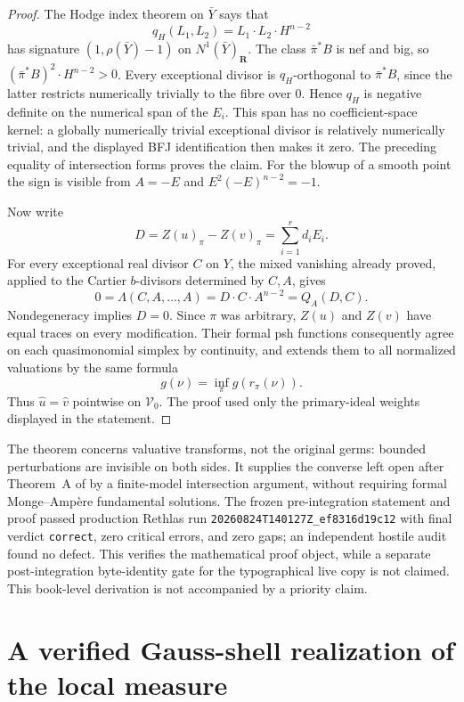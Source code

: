 \begin{proof}
The Hodge index theorem on \(\bar Y\) says that
\[
 q_H(L_1,L_2)=L_1\cdot L_2\cdot H^{n-2}
\]
has signature \((1,\rho(\bar Y)-1)\) on
\(N^1(\bar Y)_{\mathbf R}\).  The class \(\bar\pi^*B\) is nef and big,
so \((\bar\pi^*B)^2\cdot H^{n-2}>0\).  Every exceptional divisor is
\(q_H\)-orthogonal to \(\bar\pi^*B\), since the latter restricts
numerically trivially to the fibre over \(0\).  Hence \(q_H\) is negative
definite on the numerical span of the \(E_i\).  This span has no
coefficient-space kernel: a globally numerically trivial exceptional divisor
is relatively numerically trivial, and the displayed BFJ identification then
makes it zero.  The preceding equality of intersection forms proves the
claim.  For the blowup of a smooth point the sign is visible from
\(A=-E\) and \(E^2(-E)^{n-2}=-1\).

Now write
\[
              D=Z(u)_\pi-Z(v)_\pi=\sum_{i=1}^r d_iE_i.
\]
For every exceptional real divisor \(C\) on \(Y\), the mixed vanishing
already proved, applied to the Cartier \(b\)-divisors determined by
\(C,A\), gives
\[
 0=\Lambda(C,A,\ldots,A)
   =D\cdot C\cdot A^{n-2}=Q_A(D,C).
\]
Nondegeneracy implies \(D=0\).  Since \(\pi\) was arbitrary, \(Z(u)\)
and \(Z(v)\) have equal traces on every modification.  Their formal psh
functions consequently agree on each quasimonomial simplex by continuity,
and \cite[Definition~2.8 and Proposition~3.11]{BFJ08} extends them to all
normalized valuations by the same formula
\[
                          g(\nu)=\inf_\pi g(r_\pi(\nu)).
\]
Thus \(\widehat u=\widehat v\) pointwise on \(\mathcal V_0\).  The proof
used only the primary-ideal weights displayed in the statement.
\end{proof}

The theorem concerns valuative transforms, not the original germs: bounded
perturbations are invisible on both sides.  It supplies the converse left
open after Theorem~A of \cite{BFJ08} by a finite-model intersection
argument, without requiring formal Monge--Amp\`ere fundamental solutions.
The frozen pre-integration statement and proof passed production Rethlas run
\nolinkurl{20260824T140127Z_ef8316d19c12} with final verdict
\texttt{correct}, zero critical errors, and zero gaps; an independent hostile
audit found no defect.  This verifies the mathematical proof object, while a
separate post-integration byte-identity gate for the typographical live copy
is not claimed.  This book-level derivation is not accompanied by a priority
claim.

\section{A verified Gauss-shell realization of the local measure}
\label{sec:local-cld-gauss-shell}


